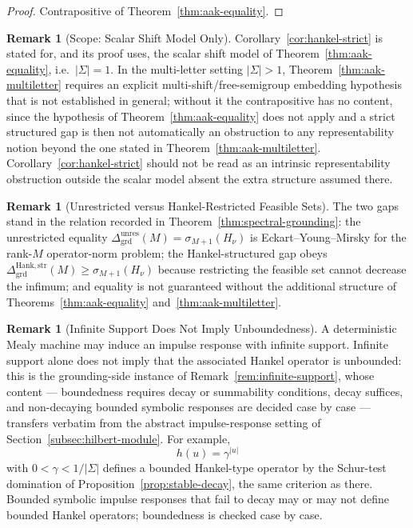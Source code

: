\documentclass[12pt]{article}
\theoremstyle{definition}
\newtheorem{remark}[theorem]{Remark}
\newcommand{\Dunres}{\Delta_{\mathrm{grd}}^{\mathrm{unres}}}
\newcommand{\DHankstr}{\Delta_{\mathrm{grd}}^{\mathrm{Hank,str}}}
\begin{document}
\begin{proof}
Contrapositive of Theorem~\ref{thm:aak-equality}.
\end{proof}

\begin{remark}[Scope: Scalar Shift Model Only]
\label{rem:hankel-strict-scope}
Corollary~\ref{cor:hankel-strict} is stated for, and its proof uses, the
scalar shift model of Theorem~\ref{thm:aak-equality}, i.e.\ $|\Sigma|=1$.  In
the multi-letter setting $|\Sigma|>1$, Theorem~\ref{thm:aak-multiletter}
requires an explicit multi-shift/free-semigroup embedding hypothesis that is
not established in general; without it the contrapositive has no content,
since the hypothesis of Theorem~\ref{thm:aak-equality} does not apply and a
strict structured gap is then not automatically an obstruction to any
representability notion beyond the one stated in
Theorem~\ref{thm:aak-multiletter}.  Corollary~\ref{cor:hankel-strict} should
not be read as an intrinsic representability obstruction outside the scalar
model absent the extra structure assumed there.
\end{remark}

\begin{remark}[Unrestricted versus Hankel-Restricted Feasible Sets]
\label{rem:grounding-unrestricted-restricted}
The two gaps stand in the relation recorded in
Theorem~\ref{thm:spectral-grounding}: the unrestricted equality
$\Dunres(M)=\sigma_{M+1}(H_\nu)$ is Eckart--Young--Mirsky for the rank-$M$
operator-norm problem; the Hankel-structured gap obeys
$\DHankstr(M)\ge\sigma_{M+1}(H_\nu)$ because restricting the feasible set
cannot decrease the infimum; and equality is not guaranteed without the
additional structure of Theorems~\ref{thm:aak-equality}
and~\ref{thm:aak-multiletter}.
\end{remark}

\begin{remark}[Infinite Support Does Not Imply Unboundedness]
\label{rem:infinite-support-grounding}
A deterministic Mealy machine may induce an impulse response with infinite
support.  Infinite support alone does not imply that the associated Hankel
operator is unbounded: this is the grounding-side instance of
Remark~\ref{rem:infinite-support}, whose content --- boundedness requires
decay or summability conditions, decay suffices, and non-decaying bounded
symbolic responses are decided case by case --- transfers verbatim from the
abstract impulse-response setting of Section~\ref{subsec:hilbert-module}.
For example,
\[
h(u)=\gamma^{|u|}
\]
with $0<\gamma<1/|\Sigma|$ defines a bounded Hankel-type operator by the
Schur-test domination of Proposition~\ref{prop:stable-decay}, the same
criterion as there.  Bounded symbolic impulse responses that fail to decay
may or may not define bounded Hankel operators; boundedness is checked case
by case.
\end{remark}
\end{document}
